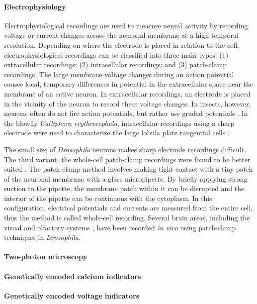 \paragraph{Electrophysiology}
Electrophysiological recordings are used to measure neural activity by recording voltage or current changes across the neuronal membrane at a high temporal resolution. Depending on where the electrode is placed in relation to the cell, electrophysiological recordings can be classified into three main types: (1) extracellular recordings; (2) intracellular recordings; and (3) patch-clamp recordings. The large membrane voltage changes during an action potential causes local, temporary differences in potential in the extracellular space near the membrane of an active neuron. In extracellular recordings, an electrode is placed in the vicinity of the neuron to record these voltage changes. In insects, however, neurons often do not fire action potentials, but rather use graded potentials \parencite{Haag1998}. In the blowfly \textit{Calliphora erythrocephala}, intracellular recordings using a sharp electrode were used to characterize the large lobula plate tangential cells \parencite{Hausen1976, Krapp1998}.

The small size of \textit{Drosophila} neurons makes sharp electrode recordings difficult. The third variant, the whole-cell patch-clamp recordings were found to be better suited \parencite{Hamill1981}. The patch-clamp method involves making tight contact with a tiny patch of the neuronal membrane with a glass micropipette. By briefly applying strong suction to the pipette, the membrane patch within it can be disrupted and the interior of the pipette can be continuous with the cytoplasm. In this configuration, electrical potentials and currents are measured from the entire cell, thus the method is called whole-cell recording. Several brain areas, including the visual \parencite{Groschner2022, Gruntman2018, Joesch2008, Behnia2014} and olfactory systems \parencite{Wilson2004}, have been recorded \textit{in vivo} using patch-clamp techniques in \textit{Drosophila}.
\paragraph{Two-photon microscopy}
\paragraph{Genetically encoded calcium indicators}
\paragraph{Genetically encoded voltage indicators}

